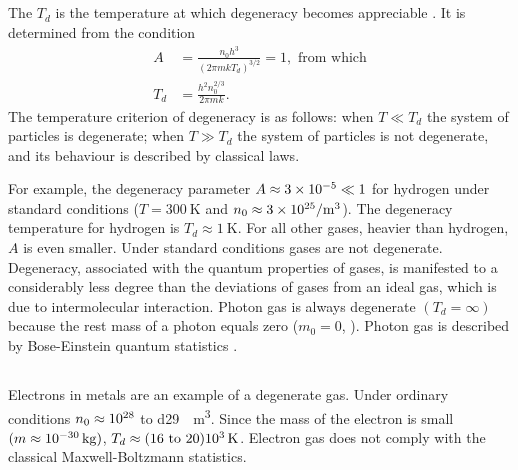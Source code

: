 \subsection{}\label{41.3.3} The  $T_{d}$ is the temperature at which degeneracy becomes appreciable . It is determined
from the condition
\begin{align*}%
A & = \frac{n_{0}h^{3}}{(2 \pi m kT_{d})^{3/2}} = 1, \text{ from which}\\
T_{d} & = \frac{h^{2}n_{0}^{2/3}}{2 \pi mk}.
\end{align*}
The temperature criterion of degeneracy is as follows: when
$T \ll T_{d}$ the system of particles is degenerate; when $T \gg T_{d}$ the system of particles is not degenerate, and its behaviour is described by classical laws.

For example, the degeneracy parameter $A \approx \num{3d-5} \ll 1$ for hydrogen under standard conditions ($T = \SI{300}{\kelvin}$ and $n_{0} \approx \SI{3d25}{\per\meter\cubed}$). The degeneracy temperature for hydrogen is $T_{d} \approx \SI{1}{\kelvin}$. For all other gases, heavier than hydrogen, $A$ is even smaller. Under standard conditions gases are not degenerate. Degeneracy, associated with the quantum properties of gases, is manifested to a considerably less degree than the deviations of gases from an ideal gas, which is due to intermolecular interaction. Photon gas is always degenerate $(T_{d} = \infty)$ because the rest mass of a photon equals zero ($m_{0} = 0$, ). Photon gas is described by Bose-Einstein quantum statistics .

\subsection{}\label{41.3.4} Electrons in metals are an example of a degenerate gas. Under ordinary conditions $n_{0} \approx \num{d28}$ to \SI{d29}{\per\meter\cubed}. Since the mass of the electron is small $(m \approx \SI{d-30}{\kilo\gram})$, $T_{d} \approx (16 \text{ to } 20) \SI{d3}{\kelvin}$. Electron gas does not comply with the classical Maxwell-Boltzmann statistics.

